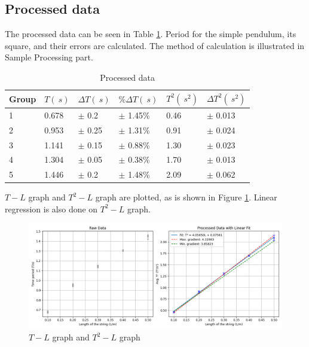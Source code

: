 \documentclass[a4paper]{article}
\newcommand{\grayrow}{\rowcolor[gray]{0.925}}
\begin{document}
\subsection{Processed data}

The processed data can be seen in Table \ref{tab.proc}. Period for the simple pendulum, its square, and their errors are calculated. The method of calculation is illustrated in Sample Processing part.

\begin{table}[!ht]
    \centering
    \caption{Processed data}
    \label{tab.proc}
    \vspace{0.2cm}
    \begin{tabularx}{0.9\textwidth}{XXXXXX}
    \hline
        Group & $T(\SI{}{s})$ & $\Delta T(\SI{}{s})$ & $\%\Delta T(\SI{}{s})$ & $T^2(\SI{}{s^2})$ & $\Delta T^2(\SI{}{s^2})$   \\ \hline
        \grayrow 1 & 0.678  & $\pm$ 0.2 & $\pm$ 1.45\% & 0.46  & $\pm$ 0.013   \\ %
        2 & 0.953  & $\pm$ 0.25 & $\pm$ 1.31\% & 0.91  & $\pm$ 0.024   \\ %
        \grayrow 3 & 1.141  & $\pm$ 0.15 & $\pm$ 0.88\% & 1.30  & $\pm$ 0.023   \\ %
        4 & 1.304  & $\pm$ 0.05 & $\pm$ 0.38\% & 1.70  & $\pm$ 0.013   \\ %
        \grayrow 5 & 1.446  & $\pm$ 0.2 & $\pm$ 1.48\% & 2.09  & $\pm$ 0.062   \\ \hline
    \end{tabularx}
\end{table}

$T-L$ graph and $T^2-L$ graph are plotted, as is shown in Figure \ref{fig.proc}. Linear regression is also done on $T^2-L$ graph. 

\begin{figure}[ht]
    \centering
    \includegraphics[width = \textwidth]{figure/Figure_1.png}
    \caption{$T-L$ graph and $T^2 - L$ graph}
    \label{fig.proc}
\end{figure}
\end{document}
